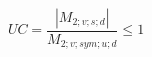\documentclass[12pt]{article}
\begin{document}
\begin{displaymath}
UC = \frac {|M_{2;v;s;d}|} {M_{2;v;sym;u;d}} \leq 1
\end{displaymath}
\end{document}
